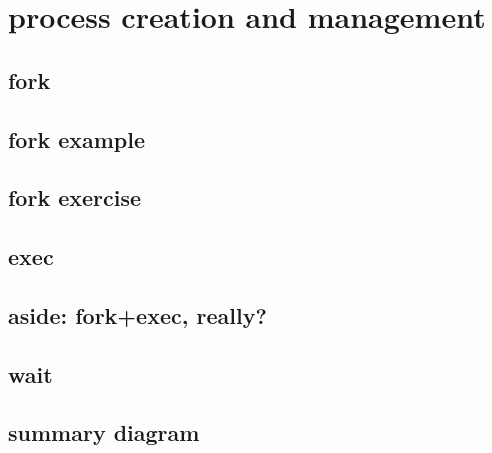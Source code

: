 \section{process creation and management}





\subsection{fork}



\subsection{fork example}


\subsection{fork exercise}




\subsection{exec}






\subsection{aside: fork+exec, really?}



\subsection{wait}





\subsection{summary diagram}

